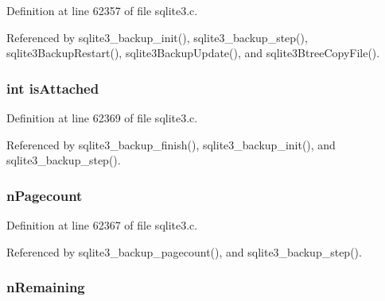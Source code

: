 Definition at line 62357 of file sqlite3.\+c.



Referenced by sqlite3\+\_\+backup\+\_\+init(), sqlite3\+\_\+backup\+\_\+step(), sqlite3\+Backup\+Restart(), sqlite3\+Backup\+Update(), and sqlite3\+Btree\+Copy\+File().

\hypertarget{structsqlite3__backup_a46ccfc2d96bd0831d4610c6da0738ecc}{}
\subsubsection[{is\+Attached}]{\setlength{\rightskip}{0pt plus 5cm}int is\+Attached}\label{structsqlite3__backup_a46ccfc2d96bd0831d4610c6da0738ecc}


Definition at line 62369 of file sqlite3.\+c.



Referenced by sqlite3\+\_\+backup\+\_\+finish(), sqlite3\+\_\+backup\+\_\+init(), and sqlite3\+\_\+backup\+\_\+step().

\hypertarget{structsqlite3__backup_a40c352fa743b4e8ae8ca29ab5c947f5c}{}
\subsubsection[{n\+Pagecount}]{ n\+Pagecount}\label{structsqlite3__backup_a40c352fa743b4e8ae8ca29ab5c947f5c}


Definition at line 62367 of file sqlite3.\+c.



Referenced by sqlite3\+\_\+backup\+\_\+pagecount(), and sqlite3\+\_\+backup\+\_\+step().

\hypertarget{structsqlite3__backup_af36e03f9d5806ab7fa1530a3950cc014}{}
\subsubsection[{n\+Remaining}]{ n\+Remaining}\label{structsqlite3__backup_af36e03f9d5806ab7fa1530a3950cc014}


